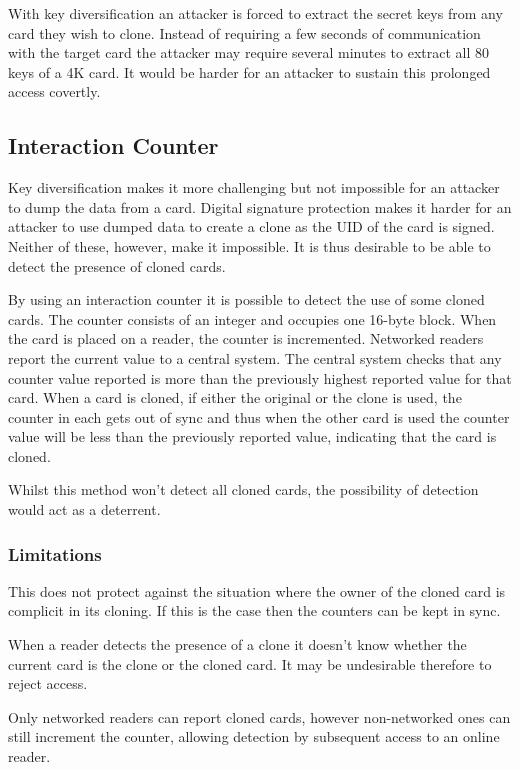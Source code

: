 \documentclass[dissertation.tex]{subfiles}
\begin{document}
  With key diversification an attacker is forced to extract the secret keys from any card they wish to clone. Instead of requiring a few seconds of communication with the target card the attacker may require several minutes to extract all 80 keys of a 4K card. It would be harder for an attacker to sustain this prolonged access covertly.


  \subsection{Interaction Counter}

  Key diversification makes it more challenging but not impossible for an attacker to dump the data from a card. Digital signature protection makes it harder for an attacker to use dumped data to create a clone as the UID of the card is signed. Neither of these, however, make it impossible. It is thus desirable to be able to detect the presence of cloned cards.

  By using an interaction counter it is possible to detect the use of some cloned cards. The counter consists of an integer and occupies one 16-byte block. When the card is placed on a reader, the counter is incremented. Networked readers report the current value to a central system. The central system checks that any counter value reported is more than the previously highest reported value for that card. When a card is cloned, if either the original or the clone is used, the counter in each gets out of sync and thus when the other card is used the counter value will be less than the previously reported value, indicating that the card is cloned.

  Whilst this method won't detect all cloned cards, the possibility of detection would act as a deterrent.

  \subsubsection{Limitations}

  This does not protect against the situation where the owner of the cloned card is complicit in its cloning. If this is the case then the counters can be kept in sync.

  When a reader detects the presence of a clone it doesn't know whether the current card is the clone or the cloned card. It may be undesirable therefore to reject access.

  Only networked readers can report cloned cards, however non-networked ones can still increment the counter, allowing detection by subsequent access to an online reader.
\end{document}
